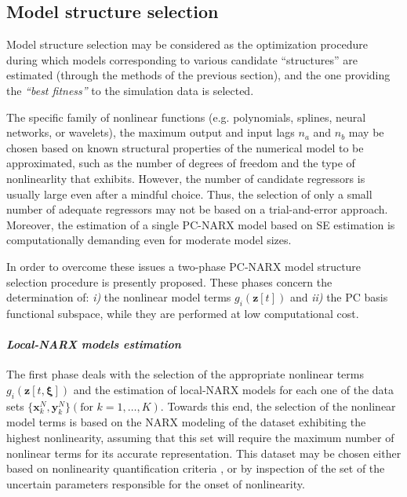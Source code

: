 \documentclass[preprint,3p,review,times,11pt]{elsarticle}
\newcommand{\bld}[1]{\boldsymbol{#1}}
\newcommand{\bxi}{\bld{\xi}}
\begin{document}
\subsection{Model structure selection}\label{sec:MSS}

Model structure selection may be considered as the optimization procedure during which models corresponding to various candidate ``structures'' are estimated (through the methods of the previous section), and the one providing the {\em ``best fitness''} to the simulation data is selected.

The specific family of nonlinear functions (e.g. polynomials, splines, neural networks, or wavelets), the maximum output and input lags $n_a$ and $n_b$ may be chosen based on known structural properties of the numerical model to be approximated, such as the number of degrees of freedom and the type of nonlinearlity that exhibits. However, the number of candidate regressors is usually large even after a mindful choice. Thus, the selection of only a small number of adequate regressors may not be based on a trial-and-error approach. Moreover, the estimation of a single PC-NARX model based on SE estimation is computationally demanding even for moderate model sizes. 

In order to overcome these issues a two-phase PC-NARX model structure selection procedure is presently proposed. These phases concern the determination of: \emph{i)} the nonlinear model terms $g_i({\bld z}[t])$ and \emph{ii)} the PC basis functional subspace, while they are performed at low computational cost.

\paragraph{\bf \em Local-NARX models estimation}
The first phase deals with the selection of the appropriate nonlinear terms $g_i({\bld z}[t,\bxi])$ and the estimation of local-NARX models for each one of the data sets $\{ {\bld x}_k^N , {\bld y}_k^N \} (\text{for } k = 1,\ldots, K)$. Towards this end, the selection of the nonlinear model terms is based on the NARX modeling of the dataset exhibiting the highest nonlinearity, assuming that this set will require the maximum number of nonlinear terms for its accurate representation. This dataset may be chosen either based on nonlinearity quantification criteria \cite{Choudhury-etal2008}, or by inspection of the set of the uncertain parameters responsible for the onset of nonlinearity. 
\end{document}
